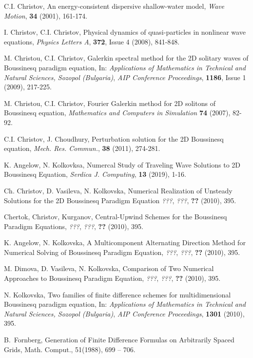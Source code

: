 \documentclass[%
 aip,
cp,  %
 amsmath,amssymb,%
 reprint,%
]{revtex4-2}
\begin{document}
\begin{thebibliography}{99} \normalsize

 C.I. Christov, An energy-consistent dispersive shallow-water model,  {\it Wave Motion}, \textbf{34} (2001), 161-174.

 I. Christov, C.I. Christov, Physical dynamics of quasi-particles in nonlinear wave equations,
{\it Physics Letters A}, \textbf{372}, Issue 4 (2008),  841-848.

   M. Christou, C.I. Christov,
Galerkin spectral method for the 2D solitary waves of Boussinesq paradigm equation,
In: {\it Applications of Mathematics in Technical and Natural Sciences, Sozopol (Bulgaria)},
\emph{AIP Conference Proceedings}, \textbf{1186}, Issue 1 (2009), 217-225.

  M. Christou, C.I. Christov,
Fourier Galerkin method for 2D solitons of Boussinesq equation,
{\it Mathematics and Computers in Simulation} \textbf{74} (2007), 82-92.

 C.I. Christov, J. Choudhury, Perturbation solution for the 2D Boussinesq equation, {\it Mech. Res. Commun.}, \textbf{38} (2011), 274-281.

  K. Angelow, N. Kolkovksa, Numercal Study of Traveling Wave Solutions to 2D Boussinesq Equation, {\it Serdica J. Computing}, \textbf{13} (2019), 1-16.

 Ch. Christov, D. Vasileva, N. Kolkovska, Numerical Realization of Unsteady Solutions for the 2D Boussinesq Paradigm Equation
{\it ???},
\emph{???}, \textbf{??} (2010), 395.

 Chertok, Christov, Kurganov, Central-Upwind Schemes for the Boussinesq Paradigm Equations,
{\it ???},
\emph{???}, \textbf{??} (2010), 395.

 K. Angelow, N. Kolkovska, A Multicomponent Alternating Direction Method for Numerical Solving of Boussinesq Paradigm Equation,
{\it ???},
\emph{???}, \textbf{??} (2010), 395.

 M. Dimova, D. Vasileva, N. Kolkovska, Comparison of Two Numerical Approaches to Boussinesq Paradigm Equation,
{\it ???},
\emph{???}, \textbf{??} (2010), 395.

 N. Kolkovska, Two families of finite difference schemes for multidimensional Boussinesq paradigm equation, In:
{\it Applications of Mathematics in Technical and Natural Sciences,  Sozopol (Bulgaria)},
\emph{AIP Conference Proceedings}, \textbf{1301} (2010), 395.

B.~Fornberg, Generation of Finite Difference Formulas on Arbitrarily Spaced Grids, 
Math. Comput., 51(1988),  699 -- 706.

%
\end{thebibliography}
\end{document}
